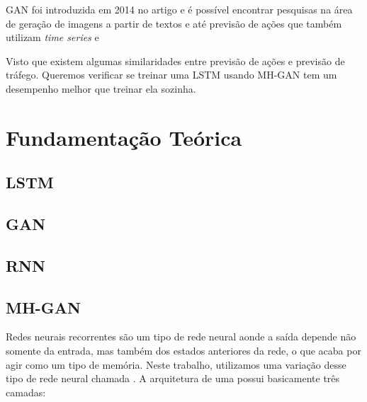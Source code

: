 \acrshort{GAN} foi introduzida em 2014 no artigo \cite{NIPS2014_5423} e é possível encontrar pesquisas na área de geração de imagens a partir de textos \cite{reed2016generative} e até previsão de ações \cite{zhou_2018} \cite{banushev_2019} que também utilizam \textit{time series} e 












Visto que existem algumas similaridades entre previsão de ações e previsão de tráfego. Queremos verificar se treinar uma \acrshort{LSTM} usando \acrshort{MH-GAN} tem um desempenho melhor que treinar ela sozinha.

\section{Fundamentação Teórica}

\subsection{LSTM}

\subsection{GAN}

\subsection{RNN}

\subsection{MH-GAN}



Redes neurais recorrentes são um tipo de rede neural aonde a saída depende não somente da entrada, mas também dos estados anteriores da rede, o que acaba por agir como um tipo de memória. Neste trabalho, utilizamos uma variação desse tipo de rede neural chamada . A arquitetura de uma  possui basicamente três camadas:


